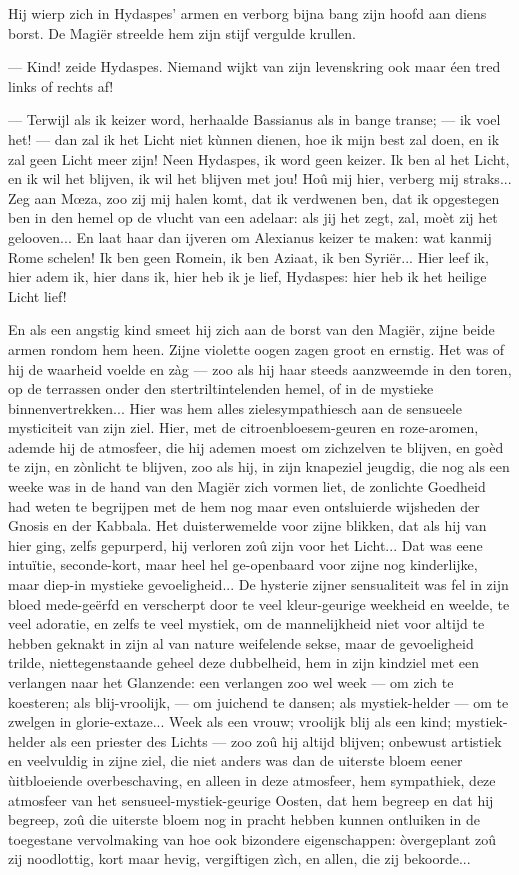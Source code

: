 \documentclass[a4paper, 12pt, oneside, dutch]{article}
\begin{document}
Hij wierp zich in Hydaspes' armen en verborg bijna bang zijn hoofd aan diens borst. De Magiër streelde hem zijn stijf vergulde krullen.

--- Kind! zeide Hydaspes. Niemand wijkt van zijn levenskring ook maar éen tred links of rechts af!

--- Terwijl als ik keizer word, herhaalde Bassianus als in bange transe; --- ik voel het! --- dan zal ik het Licht niet kùnnen dienen, hoe ik mijn best zal doen, en ik zal geen Licht meer zijn! Neen Hydaspes, ik word geen keizer. Ik ben al het Licht, en ik wil het blijven, ik wil het blijven met jou! Hoû mij hier, verberg mij straks... Zeg aan Mœza, zoo zij mij halen komt, dat ik verdwenen ben, dat ik opgestegen ben in den hemel op de vlucht van een adelaar: als jij het zegt, zal, moèt zij het gelooven... En laat haar dan ijveren om Alexianus keizer te maken: wat kanmij Rome schelen! Ik ben geen Romein, ik ben Aziaat, ik ben Syriër... Hier leef ik, hier adem ik, hier dans ik, hier heb ik je lief, Hydaspes: hier heb ik het heilige Licht lief!

En als een angstig kind smeet hij zich aan de borst van den Magiër, zijne beide armen rondom hem heen. Zijne violette oogen zagen groot en ernstig. Het was of hij de waarheid voelde en zàg --- zoo als hij haar steeds aanzweemde in den toren, op de terrassen onder den stertriltintelenden hemel, of in de mystieke binnenvertrekken... Hier was hem alles zielesympathiesch aan de sensueele mysticiteit van zijn ziel. Hier, met de citroenbloesem-geuren en roze-aromen, ademde hij de atmosfeer, die hij ademen moest om zichzelven te blijven, en goèd te zijn, en zònlicht te blijven, zoo als hij, in zijn knapeziel jeugdig, die nog als een weeke was in de hand van den Magiër zich vormen liet, de zonlichte Goedheid had weten te begrijpen met de hem nog maar even ontsluierde wijsheden der Gnosis en der Kabbala. Het duisterwemelde voor zijne blikken, dat als hij van hier ging, zelfs gepurperd, hij verloren zoû zijn voor het Licht... Dat was eene intuïtie, seconde-kort, maar heel hel ge-openbaard voor zijne nog kinderlijke, maar diep-in mystieke gevoeligheid... De hysterie zijner sensualiteit was fel in zijn bloed mede-geërfd en verscherpt door te veel kleur-geurige weekheid en weelde, te veel adoratie, en zelfs te veel mystiek, om de mannelijkheid niet voor altijd te hebben geknakt in zijn al van nature weifelende sekse, maar de gevoeligheid trilde, niettegenstaande geheel deze dubbelheid, hem in zijn kindziel met een verlangen naar het Glanzende: een verlangen zoo wel week --- om zich te koesteren; als blij-vroolijk, --- om juichend te dansen; als mystiek-helder --- om te zwelgen in glorie-extaze... Week als een vrouw; vroolijk blij als een kind; mystiek-helder als een priester des Lichts --- zoo zoû hij altijd blijven; onbewust artistiek en veelvuldig in zijne ziel, die niet anders was dan de uiterste bloem eener ùitbloeiende overbeschaving, en alleen in deze atmosfeer, hem sympathiek, deze atmosfeer van het sensueel-mystiek-geurige Oosten, dat hem begreep en dat hij begreep, zoû die uiterste bloem nog in pracht hebben kunnen ontluiken in de toegestane vervolmaking van hoe ook bizondere eigenschappen: òvergeplant zoû zij noodlottig, kort maar hevig, vergiftigen zìch, en allen, die zij bekoorde...
\end{document}
